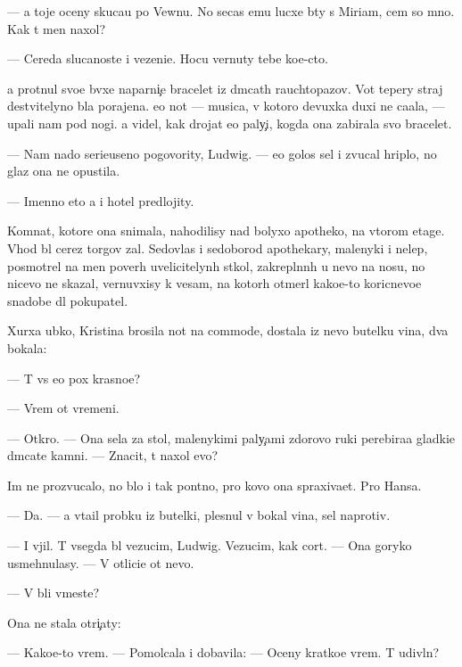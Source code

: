 \documentclass[10pt]{book}
\begin{document}
— {\Y}a toje oceny skuca{\y}u po Vewnu. No se{\y}cas {\y}emu lucxe b{\yi}ty s Miriam, cem so mno{\y}. Kak t{\yi} men{\ia} naxol?

— Cereda sluca{\y}noste{\y} i vezeni{\y}e. Hocu vernuty tebe ko{\y}e-cto.

{\Y}a prot{\ia}nul svo{\y}e{\y} b{\yi}vxe{\y} naparni{\c}e bracelet iz d{\yi}mcat{\yi}h rauchtopazov. Vot tepery straj de{\y}stvitelyno b{\yi}la porajena. {\Y}e{\y}o not{\yi} — musica, v kotoro{\y} devuxka duxi ne ca{\y}ala, — upali nam pod nogi. {\Y}a videl, kak drojat {\y}e{\y}o paly{\c}i, kogda ona zabirala svo{\y} bracelet.

— Nam nado serieuseno pogovority, Ludwig. — {\Y}e{\y}o golos sel i zvucal hriplo, no glaz ona ne opustila.

— Imenno eto {\y}a i hotel predlojity.



Komnat{\yi}, kotor{\yi}{\y}e ona snimala, nahodilisy nad bolyxo{\y} apotheko{\y}, na vtorom etage. Vhod b{\yi}l cerez torgov{\yi}{\y} zal. Sedovlas{\yi}{\y} i sedoborod{\yi}{\y} apothekary, malenyki{\y} i nelep{\yi}{\y}, posmotrel na men{\ia} poverh uvelicitelyn{\yi}h st{\e}kol, zakrepl{\e}nn{\yi}h u nevo na nosu, no nicevo ne skazal, vernuvxisy k vesam, na kotor{\yi}h otmer{\ia}l kako{\y}e-to koricnevo{\y}e snadob{\y}e dl{\ia} pokupatel{\ia}.

Xurxa {\y}ubko{\y}, Kristina brosila not{\yi} na commode, dostala iz nevo butelku vina, dva bokala:

— T{\yi} vs{\e} {\y}e{\x}o p{\y}ox krasno{\y}e?

— Vrem{\ia} ot vremeni.

— Otkro{\y}. — Ona sela za stol, malenykimi paly{\c}ami zdorovo{\y} ruki perebira{\y}a gladki{\y}e d{\yi}mcat{\yi}{\y}e kamni. — Znacit, t{\yi} naxol {\y}evo?

Im{\ia} ne prozvucalo, no b{\yi}lo i tak pon{\ia}tno, pro kovo ona spraxiva{\y}et. Pro Hansa.

— Da. — {\Y}a v{\yi}ta{\x}il probku iz butelki, plesnul v bokal{\yi} vina, sel naprotiv.

— I v{\yi}jil. T{\yi} vsegda b{\yi}l vezucim, Ludwig. Vezucim, kak cort. — Ona goryko usmehnulasy. — V otlici{\y}e ot nevo.

— V{\yi} b{\yi}li vmeste?

Ona ne stala otri{\c}aty:

— Kako{\y}e-to vrem{\ia}. — Pomolcala i dobavila: — Oceny kratko{\y}e vrem{\ia}. T{\yi} udivl{\e}n?
\end{document}
